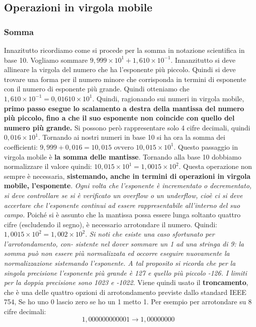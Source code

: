 \documentclass[a4paper,12pt, oneside]{book}
\begin{document}
\subsection{Operazioni in virgola mobile}
\subsubsection{Somma}
Innazitutto ricordiamo come si procede per la somma in notazione scientifica in base 10. Vogliamo sommare $9,999\times 10^1 + 1,610 \times 10^{-1}$. Innanzitutto si deve allineare la virgola del numero che ha l'esponente più piccolo. Quindi si deve trovare una forma per il numero minore che corrisponda in
termini di esponente con il numero di esponente più grande. Quindi otteniamo che $1,610 \times 10^{-1}=0,01610\times 10^1$. Quindi, ragionando sui numeri in virgola mobile, \textbf{primo passo esegue lo scalamento a destra della mantissa del numero più piccolo, fino a che il suo esponente non coincide con quello del
numero più grande.} Si possono però rappresentare solo 4 cifre decimali, quindi $0,016\times 10^1$. Tornando ai nostri numeri in base 10 si ha ora la somma dei coefficienti: $9,999+0,016 = 10,015$ ovvero $10,015\times 10^1$. Questo passaggio in virgola mobile è \textbf{la somma delle mantisse}. Tornando alla base 10 dobbiamo normalizzare il valore quindi: $10,015\times 10^1 = 1,0015\times 10^2$. Questa operazione non sempre è necessaria, \textbf{sistemando, anche in termini di operazioni in virgola mobile, l'esponente}. \textit{Ogni volta che l'esponente è incrementato o decrementato, si deve
controllare se si è verificato un overflow o un underflow, cioè ci si
deve accertare che l'esponente continui ad essere rappresentabile
all'interno del suo campo.} Poiché si è assunto che la mantissa possa essere lunga soltanto quattro cifre (escludendo il segno), è necessario arrotondare il numero.
Quindi: $1,0015\times 10^2 = 1,002\times 10^2$. \textit{Si noti che esiste una caso sfortunato per l'arrotondamento, con-
sistente nel dover sommare un 1 ad una stringa di 9: la somma può
non essere più normalizzata ed occorre eseguire nuovamente la normalizzazione sistemando l'esponente. A tal proposito si ricorda che per la singola precisione l'esponente più grande è 127 e quello più piccolo -126. I limiti per la doppia precisione sono 1023 e -1022.} Viene quindi usato il \textbf{troncamento}, che è una delle quattro
opzioni di arrotondamento previste dallo standard IEEE 754, Se ho uno 0 lascio zero se ho un 1 metto 1. Per esempio per arrotondare su 8 cifre decimali:
\[1,000000000001\longrightarrow 1,00000000 \]
\end{document}
